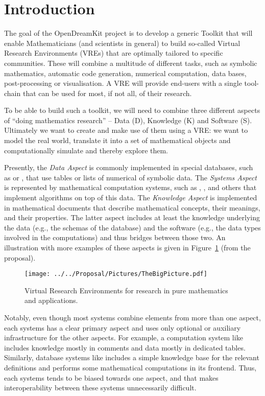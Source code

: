 \section{Introduction}\label{sec:intro}

The goal of the OpenDreamKit project \cite{ODKproposal:on} is to develop a generic Toolkit
that will enable Mathematicians (and scientists in general) to build so-called Virtual
Research Environments (VREs) that are optimally tailored to specific communities. These
will combine a multitude of different tasks, such as symbolic mathematics, automatic code
generation, numerical computation, data bases, post-processing or visualisation. A VRE
will provide end-users with a single tool-chain that can be used for most, if not all, of
their research.

To be able to build such a toolkit, we will need to combine three different aspects of
``doing mathematics research'' -- Data (D), Knowledge (K) and Software (S). Ultimately we want to
create and make use of them using a VRE: we want to model the real world, translate it
into a set of mathematical objects and computationally simulate and thereby explore them. 

Presently, the \emph{Data Aspect} is commonly implemented in special databases, such as \LMFDB or \FindStat, that use tables or lists of
numerical of symbolic data. The \emph{Systems Aspect} is represented by mathematical
computation systems, such as \GAP, \SageMath, and others that implement algorithms on top of this data. The
\emph{Knowledge Aspect} is implemented in mathematical documents that describe mathematical concepts, their meanings, and their properties.
The latter aspect includes at least the knowledge underlying the data (e.g., the schemas of the database) and the software (e.g., the data types involved in the computations) and thus bridges between those two. An
illustration with more examples of these aspects is given in
Figure~\ref{fig:thebigpicture} (from the \pn proposal).

\begin{figure}[ht]\centering
  \texttt{[image: ../../Proposal/Pictures/TheBigPicture.pdf]}
  \caption{Virtual Research Environments for research in pure
    mathematics and applications.}
  \label{fig:thebigpicture}
\end{figure}

Notably, even though most systems combine elements from more than one aspect, each systems has a clear primary aspect and uses only optional or auxiliary infrastructure for the other aspects.
For example, a computation system like \SageMath includes knowledge mostly in comments and data mostly in dedicated tables.
Similarly, database systems like \LMFDB includes a simple knowledge base for the relevant definitions and performs some mathematical computations in its frontend.
Thus, each systems tends to be biased towards one aspect, and that makes interoperability between these systems unnecessarily difficult.


